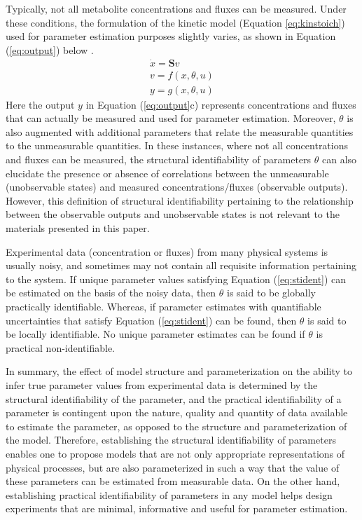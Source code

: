 \documentclass[10pt]{article}
\begin{document}
	Typically, not all metabolite concentrations and fluxes can be measured. Under these conditions, the formulation of the kinetic model (Equation \ref{eq:kinstoich}) used for parameter estimation purposes slightly varies, as shown in Equation (\ref{eq:output}) below \parencite{Gadkar2005a,Rodriguez-Fernandez2006}. 
	\begin{subequations}\label{eq:output}
		\begin{align}
		\dot{x} = \mathbf{S}v\\
		v = f(x, \theta, u)\\
		y = g(x, \theta, u)
		\end{align}
	\end{subequations}
	Here the output $y$ in Equation (\ref{eq:output}c) represents concentrations and fluxes that can actually be measured and used for parameter estimation. Moreover, $\theta$ is also augmented with additional parameters that relate the measurable quantities to the unmeasurable quantities. In these instances, where not all concentrations and fluxes can be measured, the structural identifiability of parameters $\theta$ can also elucidate the presence or absence of correlations between the unmeasurable (unobservable states) and measured concentrations/fluxes (observable outputs). However, this definition of structural identifiability pertaining to the relationship between the observable outputs and unobservable states is not relevant to the materials presented in this paper. 
	
	Experimental data (concentration or fluxes) from many physical systems is usually noisy, and sometimes may not contain all requisite information pertaining to the system. If unique parameter values satisfying Equation (\ref{eq:stident}) can be estimated on the basis of the noisy data, then $\theta$ is said to be globally practically identifiable. Whereas, if parameter estimates with quantifiable uncertainties that satisfy Equation (\ref{eq:stident}) can be found, then $\theta$ is said to be locally identifiable. No unique parameter estimates can be found if $\theta$ is practical non-identifiable. 
	
	In summary, the effect of model structure and parameterization on the ability to infer true parameter values from experimental data is determined by the structural identifiability of the parameter, and the practical identifiability of a parameter is contingent upon the nature, quality and quantity of data available to estimate the parameter, as opposed to the structure and parameterization of the model. 	
	Therefore, establishing the structural identifiability of parameters enables one to propose models that are not only appropriate representations of physical processes, but are also parameterized in such a way that the value of these parameters can be estimated from measurable data. On the other hand, establishing practical identifiability of parameters in any model helps design experiments that are minimal, informative and useful for parameter estimation.		
\end{document}
